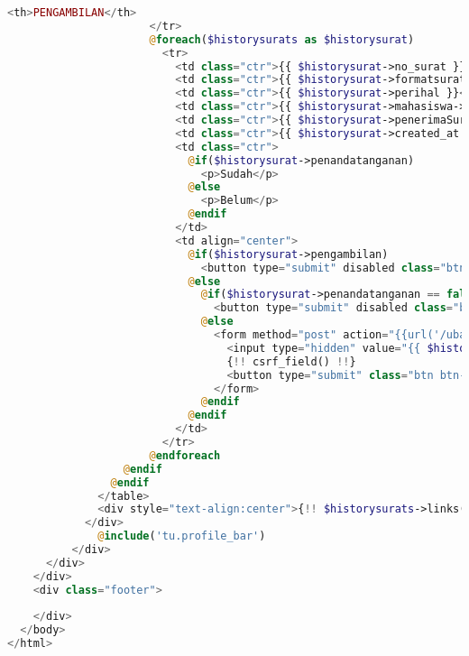 \begin{lstlisting}[language=php,basicstyle=\tiny,caption=\textit{History} TU]
                        <th>PENGAMBILAN</th>
                      </tr>
                      @foreach($historysurats as $historysurat)
                        <tr>
                          <td class="ctr">{{ $historysurat->no_surat }}</td>
                          <td class="ctr">{{ $historysurat->formatsurat->jenis_surat }}</td>
                          <td class="ctr">{{ $historysurat->perihal }}</td>
                          <td class="ctr">{{ $historysurat->mahasiswa->nama_mahasiswa }}</td>
                          <td class="ctr">{{ $historysurat->penerimaSurat }}</td>
                          <td class="ctr">{{ $historysurat->created_at }}</td>
                          <td class="ctr">
                            @if($historysurat->penandatanganan)
                              <p>Sudah</p>
                            @else
                              <p>Belum</p>
                            @endif
                          </td>
                          <td align="center">
                            @if($historysurat->pengambilan)
                              <button type="submit" disabled class="btn btn-success">Sudah</button>
                            @else
                              @if($historysurat->penandatanganan == false)
                                <button type="submit" disabled class="btn btn-default">Belum</button>
                              @else
                                <form method="post" action="{{url('/ubahStatusPengambilan')}}">
                                  <input type="hidden" value="{{ $historysurat->id }}" name="id">
                                  {!! csrf_field() !!}
                                  <button type="submit" class="btn btn-default">Belum</button>
                                </form>
                              @endif
                            @endif
                          </td>
                        </tr>
                      @endforeach
                  @endif
                @endif
              </table>
              <div style="text-align:center">{!! $historysurats->links() !!}</div>
            </div>
              @include('tu.profile_bar')
          </div>
      </div>
    </div>
    <div class="footer">
         
    </div>
  </body>
</html>
\end{lstlisting}

